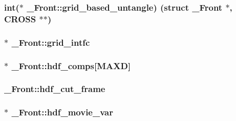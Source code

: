 \subsubsection[{\texorpdfstring{grid\+\_\+based\+\_\+untangle}{grid_based_untangle}}]{\setlength{\rightskip}{0pt plus 5cm}int($\ast$ \+\_\+\+Front\+::grid\+\_\+based\+\_\+untangle) (struct {\bf \+\_\+\+Front} $\ast$, {\bf C\+R\+O\+SS} $\ast$$\ast$)}\hypertarget{struct___front_a5f3a31f7ef1468b5ebde49fe81fb6b49}{}\label{struct___front_a5f3a31f7ef1468b5ebde49fe81fb6b49}
\subsubsection[{\texorpdfstring{grid\+\_\+intfc}{grid_intfc}}]{$\ast$ \+\_\+\+Front\+::grid\+\_\+intfc}\hypertarget{struct___front_aae3ae225dac135b774ff60dc29f27823}{}\label{struct___front_aae3ae225dac135b774ff60dc29f27823}
\subsubsection[{\texorpdfstring{hdf\+\_\+comps}{hdf_comps}}]{$\ast$ \+\_\+\+Front\+::hdf\+\_\+comps\mbox{[}{\bf M\+A\+XD}\mbox{]}}\hypertarget{struct___front_a57b53e7c4db0fe62311e1da7b3ca6d36}{}\label{struct___front_a57b53e7c4db0fe62311e1da7b3ca6d36}
\subsubsection[{\texorpdfstring{hdf\+\_\+cut\+\_\+frame}{hdf_cut_frame}}]{ \+\_\+\+Front\+::hdf\+\_\+cut\+\_\+frame}\hypertarget{struct___front_a85b97c7cfbf894aa07aec67b1c6c612e}{}\label{struct___front_a85b97c7cfbf894aa07aec67b1c6c612e}
\subsubsection[{\texorpdfstring{hdf\+\_\+movie\+\_\+var}{hdf_movie_var}}]{$\ast$ \+\_\+\+Front\+::hdf\+\_\+movie\+\_\+var}\hypertarget{struct___front_a8cd24733024da69f4753a1088c2af89e}{}\label{struct___front_a8cd24733024da69f4753a1088c2af89e}

